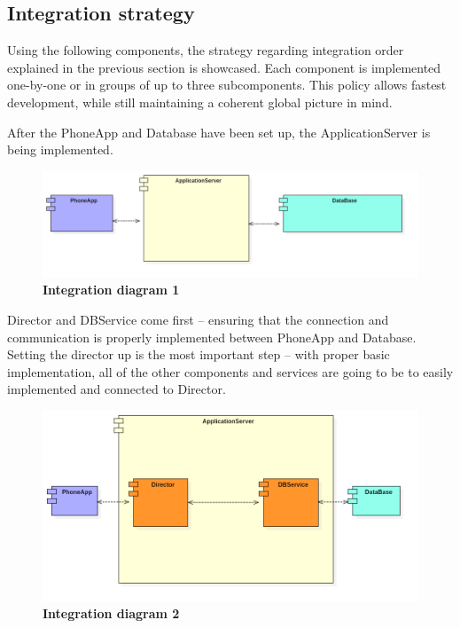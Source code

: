 \subsection{Integration strategy}

\hspace{\parindent}Using the following components, the strategy regarding integration order explained in the previous section is showcased. Each component is implemented one-by-one or in groups of up to three subcomponents. This policy allows fastest development, while still maintaining a coherent global picture in mind. 

 
After the PhoneApp and Database have been set up, the ApplicationServer is being implemented. 

 
\begin{figure}[!h]
\centering
\includegraphics[width=\textwidth]{Images/IntegrationDiagram1}
\caption{\label{fig:imp1}\textbf{Integration diagram 1}}
\end{figure}
 

Director and DBService come first – ensuring that the connection and communication is properly implemented between PhoneApp and Database. Setting the director up is the most important step – with proper basic implementation, all of the other components and services are going to be to easily implemented and connected to Director.  

 

\begin{figure}[!h]
\centering
\includegraphics[width=\textwidth]{Images/IntegrationDiagram2}
\caption{\label{fig:imp2}\textbf{Integration diagram 2}}
\end{figure}

